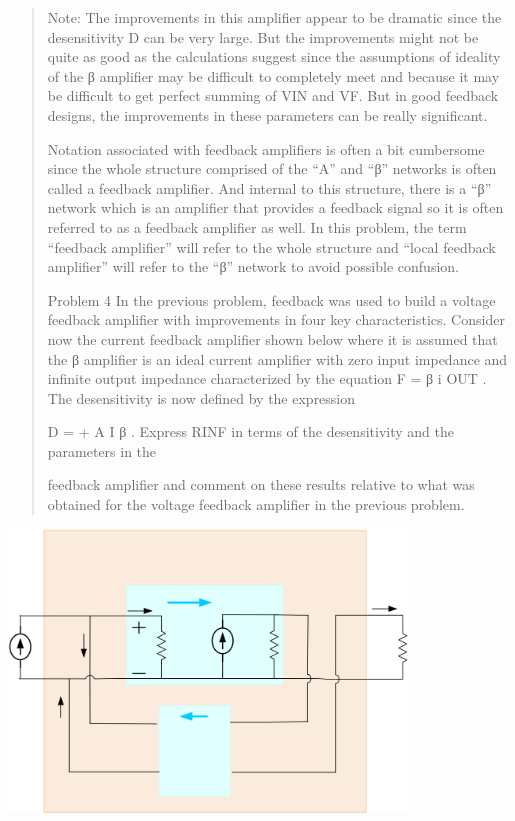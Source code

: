 \documentclass[10pt,a4paper]{article}
\begin{document}
\begin{quote}
Note: The improvements in this amplifier appear to be dramatic since the
desensitivity D can be very large. But the improvements might not be
quite as good as the calculations suggest since the assumptions of
ideality of the β amplifier may be difficult to completely meet and
because it may be difficult to get perfect summing of VIN and VF. But in
good feedback designs, the improvements in these parameters can be
really significant.

Notation associated with feedback amplifiers is often a bit cumbersome
since the whole structure comprised of the ``A'' and ``β'' networks is
often called a feedback amplifier. And internal to this structure, there
is a ``β'' network which is an amplifier that provides a feedback signal
so it is often referred to as a feedback amplifier as well. In this
problem, the term ``feedback amplifier'' will refer to the whole
structure and ``local feedback amplifier'' will refer to the ``β''
network to avoid possible confusion.

Problem 4 In the previous problem, feedback was used to build a voltage
feedback amplifier with improvements in four key characteristics.
Consider now the current feedback amplifier shown below where it is
assumed that the β amplifier is an ideal current amplifier with zero
input impedance and infinite output impedance characterized by the
equation F = β i OUT . The desensitivity is now defined by the
expression

D = + A I β . Express RINF in terms of the desensitivity and the
parameters in the

feedback amplifier and comment on these results relative to what was
obtained for the voltage feedback amplifier in the previous problem.
\end{quote}


\includegraphics[width=4.16667in,height=2.95833in]{vertopal_3376d9a0695b4078a59040ba2f51c60d/media/image2.png}
\end{document}
